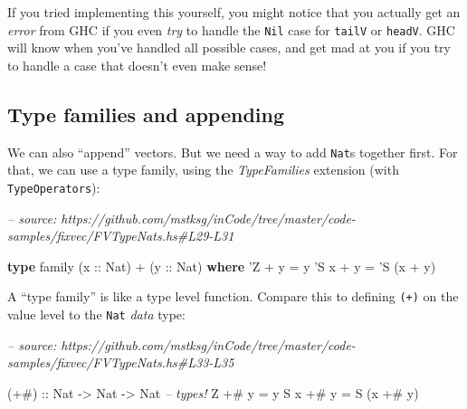 \documentclass[]{article}
\newenvironment{Shaded}{}{}
\newcommand{\CommentTok}[1]{\textcolor[rgb]{0.38,0.63,0.69}{\textit{#1}}}
\newcommand{\DataTypeTok}[1]{\textcolor[rgb]{0.56,0.13,0.00}{#1}}
\newcommand{\FunctionTok}[1]{\textcolor[rgb]{0.02,0.16,0.49}{#1}}
\newcommand{\KeywordTok}[1]{\textcolor[rgb]{0.00,0.44,0.13}{\textbf{#1}}}
\newcommand{\NormalTok}[1]{#1}
\newcommand{\OtherTok}[1]{\textcolor[rgb]{0.00,0.44,0.13}{#1}}
\begin{document}
If you tried implementing this yourself, you might notice that you actually get
an \emph{error} from GHC if you even \emph{try} to handle the \texttt{Nil} case
for \texttt{tailV} or \texttt{headV}. GHC will know when you've handled all
possible cases, and get mad at you if you try to handle a case that doesn't even
make sense!

\hypertarget{type-families-and-appending}{%
\subsection{Type families and appending}\label{type-families-and-appending}}

We can also ``append'' vectors. But we need a way to add \texttt{Nat}s together
first. For that, we can use a type family, using the \emph{TypeFamilies}
extension (with \texttt{TypeOperators}):

\begin{Shaded}
\begin{Highlighting}[]
\CommentTok{-- source: https://github.com/mstksg/inCode/tree/master/code-samples/fixvec/FVTypeNats.hs#L29-L31}

\KeywordTok{type}\NormalTok{ family (}\OtherTok{x ::} \DataTypeTok{Nat}\NormalTok{) }\FunctionTok{+}\NormalTok{ (}\OtherTok{y ::} \DataTypeTok{Nat}\NormalTok{) }\KeywordTok{where}
\NormalTok{    '}\DataTypeTok{Z}   \FunctionTok{+}\NormalTok{ y }\FunctionTok{=}\NormalTok{ y}
\NormalTok{    '}\DataTypeTok{S}\NormalTok{ x }\FunctionTok{+}\NormalTok{ y }\FunctionTok{=}\NormalTok{ '}\DataTypeTok{S}\NormalTok{ (x }\FunctionTok{+}\NormalTok{ y)}
\end{Highlighting}
\end{Shaded}

A ``type family'' is like a type level function. Compare this to defining
\texttt{(+)} on the value level to the \texttt{Nat} \emph{data} type:

\begin{Shaded}
\begin{Highlighting}[]
\CommentTok{-- source: https://github.com/mstksg/inCode/tree/master/code-samples/fixvec/FVTypeNats.hs#L33-L35}

\OtherTok{(+#) ::} \DataTypeTok{Nat} \OtherTok{->} \DataTypeTok{Nat} \OtherTok{->} \DataTypeTok{Nat}       \CommentTok{-- types!}
\DataTypeTok{Z}   \FunctionTok{+#}\NormalTok{ y }\FunctionTok{=}\NormalTok{ y}
\DataTypeTok{S}\NormalTok{ x }\FunctionTok{+#}\NormalTok{ y }\FunctionTok{=} \DataTypeTok{S}\NormalTok{ (x }\FunctionTok{+#}\NormalTok{ y)}
\end{Highlighting}
\end{Shaded}
\end{document}

